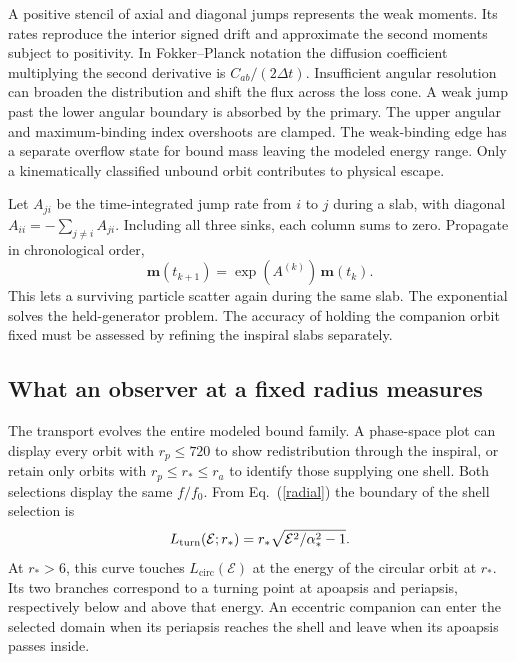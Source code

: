 \documentclass[aps,prd,reprint,amsmath,amssymb,nofootinbib]{revtex4-2}
\newcommand{\E}{\mathcal E}
\newcommand{\circsub}{\mathrm{circ}}
\begin{document}
A positive stencil of axial and diagonal jumps represents the weak moments. Its rates reproduce the interior signed drift and approximate the second moments subject to positivity. In Fokker--Planck notation the diffusion coefficient multiplying the second derivative is $C_{ab}/(2\Delta t)$. Insufficient angular resolution can broaden the distribution and shift the flux across the loss cone. A weak jump past the lower angular boundary is absorbed by the primary. The upper angular and maximum-binding index overshoots are clamped. The weak-binding edge has a separate overflow state for bound mass leaving the modeled energy range. Only a kinematically classified unbound orbit contributes to physical escape.

Let $A_{ji}$ be the time-integrated jump rate from $i$ to $j$ during a slab, with diagonal $A_{ii}=-\sum_{j\ne i}A_{ji}$. Including all three sinks, each column sums to zero. Propagate in chronological order,
\begin{equation}
 \boldsymbol m(t_{k+1})=\exp(A^{(k)})\,\boldsymbol m(t_k).
 \label{prop}
\end{equation}
This lets a surviving particle scatter again during the same slab. The exponential solves the held-generator problem. The accuracy of holding the companion orbit fixed must be assessed by refining the inspiral slabs separately.

\subsection{What an observer at a fixed radius measures}
The transport evolves the entire modeled bound family. A phase-space plot can display every orbit with $r_p\le720$ to show redistribution through the inspiral, or retain only orbits with $r_p\le r_*\le r_a$ to identify those supplying one shell. Both selections display the same $f/f_0$. From Eq.~(\ref{radial}) the boundary of the shell selection is
\begin{equation}
 L_{\rm turn}(\E;r_*)=r_*\sqrt{\E^2/\alpha_*^2-1}.
\end{equation}
At $r_*>6$, this curve touches $L_{\circsub}(\E)$ at the energy of the circular orbit at $r_*$. Its two branches correspond to a turning point at apoapsis and periapsis, respectively below and above that energy. An eccentric companion can enter the selected domain when its periapsis reaches the shell and leave when its apoapsis passes inside.
\end{document}
